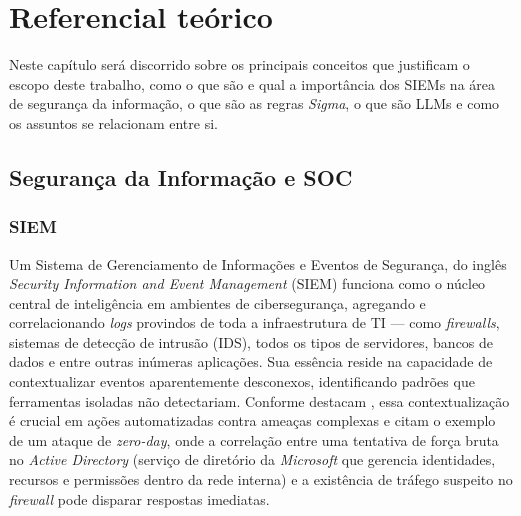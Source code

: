\chapter{Referencial te\'orico}\label{cap:referencialTeorico}

Neste capítulo será discorrido sobre os principais conceitos que justificam o escopo deste trabalho, como o que são e qual a importância dos SIEMs na área de segurança da informação, o que são as regras \textit{Sigma}, o que são LLMs e como os assuntos se relacionam entre si.

\section{Segurança da Informação e SOC}



\subsection{SIEM}

Um Sistema de Gerenciamento de Informações e Eventos de Segurança, do inglês \textit{Security Information and Event Management} (SIEM) funciona como o núcleo central de inteligência em ambientes de cibersegurança,
agregando e correlacionando \textit{logs} provindos de toda a infraestrutura de TI --- como \textit{firewalls}, sistemas de detecção de intrusão (IDS), todos os tipos de servidores, bancos de dados e entre outras inúmeras aplicações. 
Sua essência reside na capacidade de contextualizar eventos aparentemente desconexos, identificando padrões que ferramentas isoladas não detectariam. 
Conforme destacam , essa contextualização é crucial em ações automatizadas contra ameaças complexas e citam o exemplo de um ataque de \textit{zero-day}, onde a correlação entre uma tentativa de força bruta no \textit{Active Directory} 
(serviço de diretório da \textit{Microsoft} que gerencia identidades, recursos e permissões dentro da rede interna) e a existência de tráfego suspeito no \textit{firewall} pode disparar respostas imediatas.

